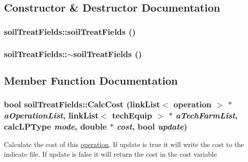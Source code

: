 \subsection{Constructor \& Destructor Documentation}
\hypertarget{classsoil_treat_fields_a8ad117f99639581ba5f2591861193b77}{
\subsubsection[{soilTreatFields}]{\setlength{\rightskip}{0pt plus 5cm}soilTreatFields::soilTreatFields ()}}
\label{classsoil_treat_fields_a8ad117f99639581ba5f2591861193b77}
\hypertarget{classsoil_treat_fields_ac73a1dabe76596e3c21281c58cded486}{
\subsubsection[{$\sim$soilTreatFields}]{\setlength{\rightskip}{0pt plus 5cm}soilTreatFields::$\sim$soilTreatFields ()}}
\label{classsoil_treat_fields_ac73a1dabe76596e3c21281c58cded486}


\subsection{Member Function Documentation}
\hypertarget{classsoil_treat_fields_a1b486e3dcf8ea9e3c0e8c58ec801a3e9}{
\subsubsection[{CalcCost}]{\setlength{\rightskip}{0pt plus 5cm}bool soilTreatFields::CalcCost ({\bf linkList}$<$ {\bf operation} $>$ $\ast$ {\em aOperationList}, \/  {\bf linkList}$<$ {\bf techEquip} $>$ $\ast$ {\em aTechFarmList}, \/  {\bf calcLPType} {\em mode}, \/  double $\ast$ {\em cost}, \/  bool {\em update})}}
\label{classsoil_treat_fields_a1b486e3dcf8ea9e3c0e8c58ec801a3e9}
Calculate the cost of this \hyperlink{classoperation}{operation}. If update is true it will write the cost to the indicate file. If update is false it will return the cost in the cost variable 

